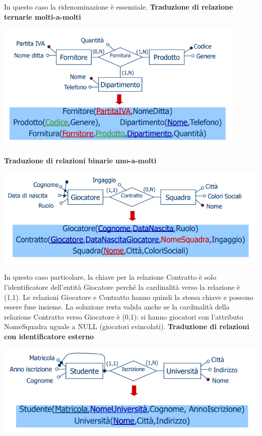 \documentclass[12pt]{article}
\begin{document}
In questo caso la ridenominazione è essenziale. \newline
\textbf{Traduzione di relazione ternarie molti-a-molti}
\begin{center}
    \includegraphics[width = 0.90\textwidth]{Images/115.PNG}
\end{center}
\textbf{Traduzione di relazioni binarie uno-a-molti}
\begin{center}
    \includegraphics[width = 1\textwidth]{Images/116.PNG}
\end{center}
In questo caso particolare, la chiave per la relazione Contratto è solo l'identificatore dell'entità Giocatore perché la cardinalità verso la relazione è (1,1).
Le relazioni Giocatore e Contratto hanno quindi la stessa chiave e possono essere fuse insieme.
La soluzione resta valida anche se la cardinalità della relazione Contratto verso Giocatore è (0,1): si hanno giocatori con l'attributo NomeSquadra uguale a NULL (giocatori svincolati). \newline
\textbf{Traduzione di relazioni con identificatore esterno}
\begin{center}
    \includegraphics[width = 1\textwidth]{Images/117.PNG}
\end{center}
\end{document}
